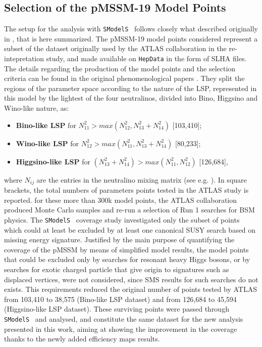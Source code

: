 \documentclass[a4paper,11pt]{article}
\newcommand{\SMO}{\texttt{SModelS\xspace}}
\begin{document}
\subsection{Selection of the pMSSM-19 Model Points}
The setup for the analysis with \SMO~ follows closely what described originally in \cite{Ambrogi:2017lov}, that is here summarized. The pMSSM-19 model points considered represent a subset of the dataset originally used by the ATLAS collaboration in the re-intepretation study\cite{Aad:2015baa}, and made available on \texttt{HepData}\cite{ATLASpMSSMhepdata} in the form of SLHA\cite{Skands:2003cj} files. The details regarding the production of the model points and the selection criteria can be found in the original phenomenological papers \cite{Berger:2008cq,CahillRowley:2012cb,CahillRowley:2012kx,Cahill-Rowley:2014twa}.
They split the regions of the parameter space according to the nature of the LSP, represented in this model by the lightest of the four neutralinos, divided into Bino, Higgsino and Wino-like nature, as:
\begin{itemize}
	\item \textbf{Bino-like LSP} for $N_{11}^2 > max(N^2_{12},N^2_{13} + N^2_{14})$ [103,410]; \
	\item \textbf{Wino-like LSP} for $N_{12}^2 > max(N^2_{11},N^2_{13} + N^2_{14})$ [80,233]; \
	\item \textbf{Higgsino-like LSP} for $(N_{13}^2 + N_{14}^2 )  > max(N^2_{11},N^2_{12})$ [126,684],\
\end{itemize}
where $N_{ij}$ are the entries in the neutralino mixing matrix (see e.g. \cite{Martin:1997ns}). In square brackets, the total numbers of parameters points tested in the ATLAS study is reported. for these more than 300k model points, the ATLAS collaboration produced Monte Carlo samples and re-run a selection of Run 1 searches for BSM physics. The \SMO~ coverage study investigated only the subset of points which could at least be excluded by at least one canonical SUSY search based on missing energy signature. Justified by the main purpose of quantifying the coverage of the pMSSM by means of simplified model results, the model points that could be excluded only by searches for resonant heavy Higgs bosons, or by searches for exotic charged particle that give origin to signatures such as displaced vertices, were not considered, since SMS results for such searches do not exists.
This requirements reduced the original number of points tested by ATLAS from 103,410 to 38,575 (Bino-like LSP dataset) and from 126,684 to 45,594 (Higgsino-like LSP dataset). These surviving points were passed through \SMO~ and analysed, and constitute the same dataset for the new analysis presented in this work, aiming at showing the improvement in the coverage thanks to the newly added efficiency maps results. 
\end{document}
